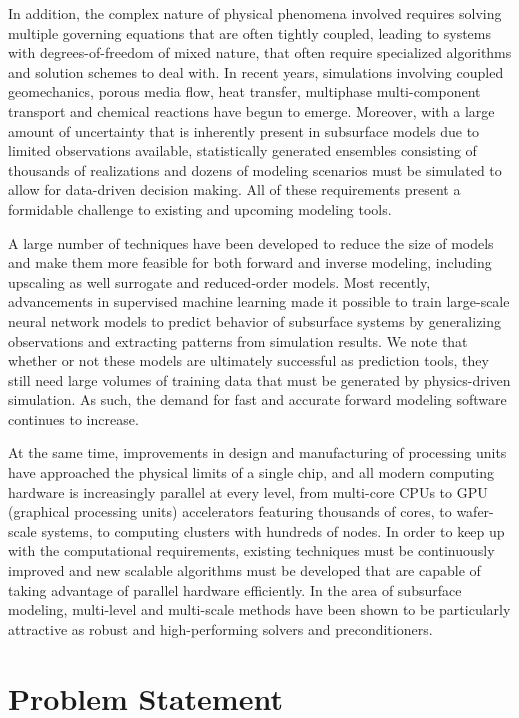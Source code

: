 In addition, the complex nature of physical phenomena involved requires solving multiple governing equations that are often tightly coupled, leading to systems with degrees-of-freedom of mixed nature, that often require specialized algorithms and solution schemes to deal with.   In recent years, simulations involving coupled geomechanics, porous media flow, heat transfer, multiphase multi-component transport and chemical reactions have begun to emerge.   Moreover, with a large amount of uncertainty that is inherently present in subsurface models due to limited observations available, statistically generated ensembles consisting of thousands of realizations and dozens of modeling scenarios must be simulated to allow for data-driven decision making.   All of these requirements present a formidable challenge to existing and upcoming modeling tools. 

A large number of techniques have been developed to reduce the size of models and make them more feasible for both forward and inverse modeling, including upscaling as well surrogate and reduced-order models.   Most recently, advancements in supervised machine learning made it possible to train large-scale neural network models to predict behavior of subsurface systems by generalizing observations and extracting patterns from simulation results.   We note that whether or not these models are ultimately successful as prediction tools, they still need large volumes of training data that must be generated by physics-driven simulation.   As such, the demand for fast and accurate forward modeling software continues to increase.

At the same time, improvements in design and manufacturing of processing units have approached the physical limits of a single chip, and all modern computing hardware is increasingly parallel at every level, from multi-core CPUs to GPU (graphical processing units) accelerators featuring thousands of cores, to wafer-scale systems, to computing clusters with hundreds of nodes.   In order to keep up with the computational requirements, existing techniques must be continuously improved and new scalable algorithms must be developed that are capable of taking advantage of parallel hardware efficiently.   In the area of subsurface modeling, multi-level and multi-scale methods have been shown to be particularly attractive as robust and high-performing solvers and preconditioners.

\section{Problem Statement}
\label{sec:intro_problem}

